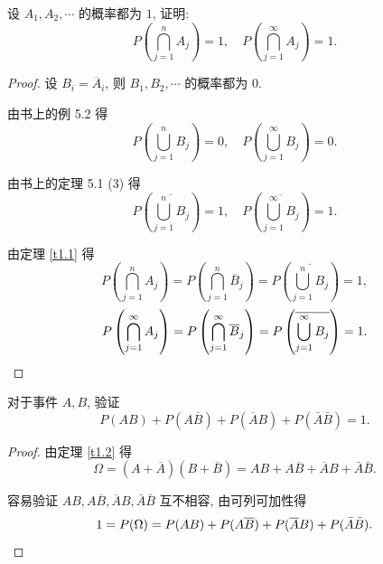 \documentclass[color=black,device=normal,lang=cn]{elegantnote}
\numberwithin{equation}{section}
\theoremstyle{plain}
\numberwithin{exercise}{exsection}
\begin{document}
\begin{exercise}%
    设 $A_1,A_2,\cdots$ 的概率都为 $1$, 证明:
    \[P\left(\bigcap\limits_{j=1}^nA_j\right)=1,\quad P\left(\bigcap\limits_{j=1}^\infty A_j\right)=1.\]
\end{exercise}
\begin{proof}
    设 $B_i=\overline{A}_i$, 则 $B_1,B_2,\cdots$ 的概率都为 $0$.
    
    由书上的例 5.2 得
    \[P\left(\bigcup\limits_{j=1}^nB_j\right)=0,\quad P\left(\bigcup\limits_{j=1}^\infty B_j\right)=0.\]

    由书上的定理 5.1 (3) 得
    \[P\left(\overline{\bigcup\limits_{j=1}^nB_j}\right)=1,\quad P\left(\overline{\bigcup\limits_{j=1}^\infty B_j}\right)=1.\]

    由定理 \ref{t1.1} 得
    \[P\left(\bigcap\limits_{j=1}^nA_j\right)=P\left(\bigcap\limits_{j=1}^n\overline{B}_j\right)=P\left(\overline{\bigcup\limits_{j=1}^nB_j}\right)=1,\]
    \[P\left(\bigcap\limits_{j=1}^\infty A_j\right)=P\left(\bigcap\limits_{j=1}^\infty\overline{B}_j\right)=P\left(\overline{\bigcup\limits_{j=1}^\infty B_j}\right)=1.\qedhere\]
\end{proof}
\begin{exercise}\label{ex1.19}
    对于事件 $A,B$, 验证
    \[P(AB)+P(A\overline{B})+P(\overline{A}B)+P(\bar{A}\bar{B})=1.\]
\end{exercise}
\begin{proof}
    由定理 \ref{t1.2} 得
    \[\Omega=(A+\overline{A})(B+\overline{B})=AB+A\overline{B}+\overline{A}B+\bar{A}\bar{B}.\]

    容易验证 $AB,A\overline{B},\overline{A}B,\bar{A}\bar{B}$ 互不相容, 由可列可加性得
    \[1=P(\Omega)=P(AB)+P(A\overline{B})+P(\overline{A}B)+P(\bar{A}\bar{B}).\qedhere\]
\end{proof}
\end{document}
